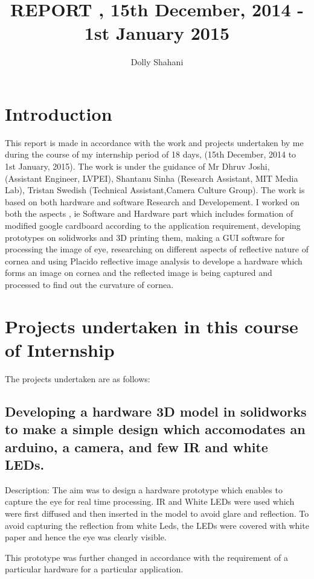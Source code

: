 \documentclass[12pt]{article}
\title{ REPORT , 15th December, 2014 - 1st January 2015}
\author{Dolly Shahani}
\begin{document}
\maketitle


\section{Introduction}

This report is made in accordance with the work and projects undertaken by me during the course of my internship period of 18 days, (15th December, 2014 to 1st January, 2015). The work is under the guidance of Mr Dhruv Joshi, (Assistant Engineer, LVPEI), Shantanu Sinha (Research Assistant, MIT Media Lab), Tristan Swedish (Technical Assistant,Camera Culture Group). The work is based on both hardware and software Research and Developement. I worked on both the aspects , ie Software and Hardware part which includes formation of modified google cardboard according to the application requirement, developing prototypes on solidworks and 3D printing them, making a GUI software for processing the image of eye, researching on different aspects of reflective nature of cornea and using Placido reflective image analysis to develope a hardware which forms an image on cornea and the reflected image is being captured and processed to find out the curvature of cornea.\\


\section{Projects undertaken in this course of Internship}


The projects undertaken are as follows:
\subsection{Developing a hardware 3D model in solidworks to make a simple design which accomodates an arduino, a camera, and few IR and white LEDs.} 

Description: The aim was to design a hardware prototype which enables to capture the eye for real time processing. IR and White LEDs were used which were first diffused and then inserted in the model to avoid glare and reflection. To avoid capturing the reflection from white Leds, the LEDs were covered with white paper and hence the eye was clearly visible. 

This prototype was further changed in accordance with the requirement of a particular hardware for a particular application.
\end{document}
